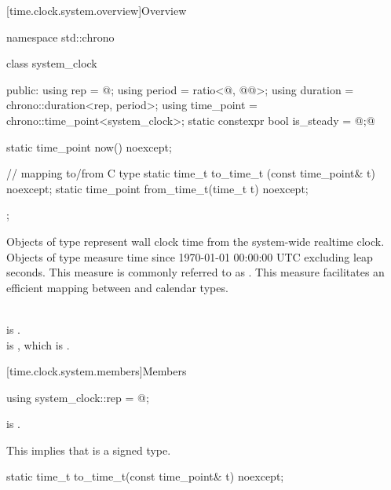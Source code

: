 [time.clock.system.overview]{Overview}
%

\begin{codeblock}
namespace std::chrono {
  class system_clock {
  public:
    using rep        = @\seebelow@;
    using period     = ratio<@\unspecnc@, @\unspec{}@>;
    using duration   = chrono::duration<rep, period>;
    using time_point = chrono::time_point<system_clock>;
    static constexpr bool is_steady = @\unspec;@

    static time_point now() noexcept;

    // mapping to/from C type 
    static time_t      to_time_t  (const time_point& t) noexcept;
    static time_point  from_time_t(time_t t) noexcept;
  };
}
\end{codeblock}

\pnum
Objects of type  represent wall clock time from the system-wide
realtime clock.
Objects of type  measure time since
1970-01-01 00:00:00 UTC excluding leap seconds.
This measure is commonly referred to as .
This measure facilitates an efficient mapping between
 and calendar types.
\begin{example}
\\
 is . \\
 is ,
which is . \\
\end{example}

[time.clock.system.members]{Members}

%
\begin{itemdecl}
using system_clock::rep = @\unspec@;
\end{itemdecl}

\begin{itemdescr}
\pnum
\constraints
{} is . \\
\begin{note}
This implies that  is a signed type.
\end{note}
\end{itemdescr}

%
\begin{itemdecl}
static time_t to_time_t(const time_point& t) noexcept;
\end{itemdecl}

